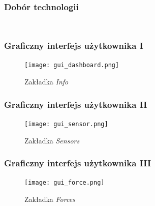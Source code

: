 \documentclass[aspectratio=169]{beamer}  %
\begin{document}
\begin{frame}
	\frametitle{Dobór  technologii}
	\begin{columns}
		\begin{column}{0.33\textwidth}
			\begin{figure}
				\centering
			\end{figure}
			\begin{figure}
				\centering
			\end{figure}
		\end{column}
		\begin{column}{0.33\textwidth}
			\begin{figure}
				\centering
			\end{figure}
			\begin{figure}
				\centering
			\end{figure}
		\end{column}
		\begin{column}{0.33\textwidth}
			\begin{figure}
				\centering
			\end{figure}
			\begin{figure}
				\centering
			\end{figure}
		\end{column}
	\end{columns}
\end{frame}

\begin{frame}
	\frametitle{Graficzny interfejs użytkownika I}
	\begin{figure}
		\centering
		\texttt{[image: gui\_dashboard.png]}
		\caption{Zakładka \textit{Info}}
	\end{figure}
\end{frame}

\begin{frame}
	\frametitle{Graficzny interfejs użytkownika II}
	\begin{figure}
		\centering
		\texttt{[image: gui\_sensor.png]}
		\caption{Zakładka \textit{Sensors}}
	\end{figure}
\end{frame}

\begin{frame}
	\frametitle{Graficzny interfejs użytkownika III}
	\begin{figure}
		\centering
		\texttt{[image: gui\_force.png]}
		\caption{Zakładka \textit{Forces}}
	\end{figure}
\end{frame}
\end{document}
